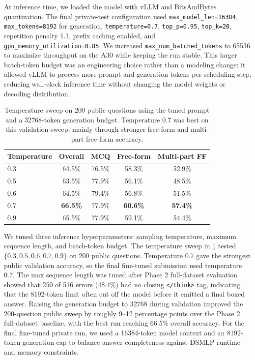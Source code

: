 \documentclass{article}
\begin{document}
At inference time, we loaded the model with vLLM and BitsAndBytes quantization.  The final private-test configuration used \texttt{max\_model\_len=16384}, \texttt{max\_tokens=8192} for generation, \texttt{temperature=0.7}, \texttt{top\_p=0.95}, \texttt{top\_k=20}, repetition penalty 1.1, prefix caching enabled, and \texttt{gpu\_memory\_utilization=0.85}.  We increased \texttt{max\_num\_batched\_tokens} to 65536 to maximize throughput on the A30 while keeping the run stable.  This larger batch-token budget was an engineering choice rather than a modeling change: it allowed vLLM to process more prompt and generation tokens per scheduling step, reducing wall-clock inference time without changing the model weights or decoding distribution.

\begin{table}[t]
  \caption{Temperature sweep on 200 public questions using the tuned prompt and a 32768-token generation budget.  Temperature 0.7 was best on this validation sweep, mainly through stronger free-form and multi-part free-form accuracy.}
  \label{tab:temperature_sweep_impl}
  \centering
  \begin{tabular}{lcccc}
    \toprule
    Temperature & Overall & MCQ & Free-form & Multi-part FF \\
    \midrule
    0.3 & 64.5\% & 76.5\% & 58.3\% & 52.9\% \\
    0.5 & 63.5\% & 77.9\% & 56.1\% & 48.5\% \\
    0.6 & 64.5\% & 79.4\% & 56.8\% & 51.5\% \\
    0.7 & \textbf{66.5\%} & 77.9\% & \textbf{60.6\%} & \textbf{57.4\%} \\
    0.9 & 65.5\% & 77.9\% & 59.1\% & 54.4\% \\
    \bottomrule
  \end{tabular}
\end{table}

We tuned three inference hyperparameters: sampling temperature, maximum sequence length, and batch-token budget.  The temperature sweep in \cref{tab:temperature_sweep_impl} tested $\{0.3,0.5,0.6,0.7,0.9\}$ on 200 public questions.  Temperature 0.7 gave the strongest public validation accuracy, so the final fine-tuned submission used temperature 0.7.  The max sequence length was tuned after Phase 2 full-dataset evaluation showed that 250 of 516 errors (48.4\%) had no closing \texttt{</think>} tag, indicating that the 8192-token limit often cut off the model before it emitted a final boxed answer.  Raising the generation budget to 32768 during validation improved the 200-question public sweep by roughly 9--12 percentage points over the Phase 2 full-dataset baseline, with the best run reaching 66.5\% overall accuracy.  For the final fine-tuned private run, we used a 16384-token model context and an 8192-token generation cap to balance answer completeness against DSMLP runtime and memory constraints.
\end{document}
